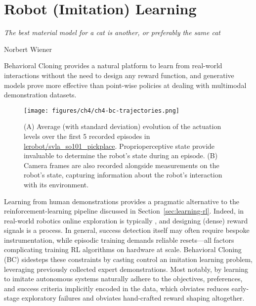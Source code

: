 \section{Robot (Imitation) Learning}
\label{sec:robot-imitation-learning}

\epigraph{\emph{The best material model for a cat is another, or preferably the same cat}}{Norbert Wiener}

\begin{tldr}
Behavioral Cloning provides a natural platform to learn from real-world interactions without the need to design any reward function, and generative models prove more effective than point-wise policies at dealing with multimodal demonstration datasets.
\end{tldr}

\begin{figure}
    \centering
    \texttt{[image: figures/ch4/ch4-bc-trajectories.png]}
    \caption{(A) Average (with standard deviation) evolution of the actuation levels over the first 5 recorded episodes in \url{lerobot/svla_so101_pickplace}. Proprioperceptive state provide invaluable to determine the robot's state during an episode. (B) Camera frames are also recorded alongside measurements on the robot's state, capturing information about the robot's interaction with its environment.}
    \label{fig:ch4-bc-trajectories}
\end{figure}

Learning from human demonstrations provides a pragmatic alternative to the reinforcement-learning pipeline discussed in Section~\ref{sec:learning-rl}.
Indeed, in real-world robotics online exploration is typically , and designing (dense) reward signals is a  process.
In general, success detection itself may often require bespoke instrumentation, while episodic training demands reliable resets---all factors complicating training RL algorithms on hardware at scale.
Behavioral Cloning (BC) sidesteps these constraints by casting control an imitation learning problem, leveraging previously collected expert demonstrations.
Most notably, by learning to imitate autonomous systems naturally adhere to the objectives, preferences, and success criteria implicitly encoded in the data, which obviates reduces early-stage exploratory failures and obviates hand-crafted reward shaping altogether.

